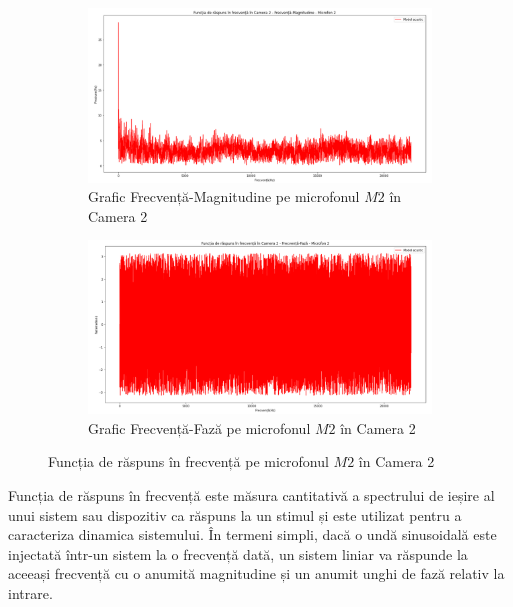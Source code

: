 	\begin{figure}[!htb]%
		\begin{subfigure}[b]{0.95\textwidth}
			\centering
			\includegraphics[width=1\linewidth]{imagini/fr_mag.png} 
			\caption{Grafic Frecvență-Magnitudine pe microfonul $M2$ în Camera 2}
		\end{subfigure}
		\vfill
		\begin{subfigure}[b]{0.95\textwidth}
			\centering
			\includegraphics[width=1\linewidth]{imagini/fr_faza.png}
			\caption{Grafic Frecvență-Fază pe microfonul $M2$ în Camera 2}
		\end{subfigure}
		
		\caption{Funcția de răspuns în frecvență pe microfonul $M2$ în Camera 2}
		\label{fig:Fig24}	
	\end{figure}

	Funcția de răspuns în frecvență este măsura cantitativă a spectrului de ieșire al unui sistem sau dispozitiv ca răspuns la un stimul și este utilizat pentru a caracteriza dinamica sistemului. În termeni simpli, dacă o undă sinusoidală este injectată într-un sistem la o frecvență dată, un sistem liniar va răspunde la aceeași frecvență cu o anumită magnitudine și un anumit unghi de fază relativ la intrare.
	
